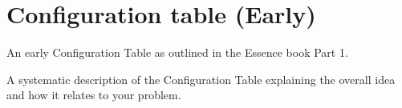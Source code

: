 \section{Configuration table (Early)}
An early Configuration Table as outlined in the Essence book Part 1.


A systematic description of the Configuration Table explaining the overall idea and how it relates to your problem.

